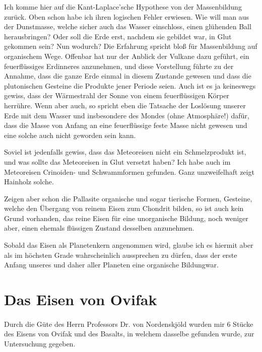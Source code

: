 \documentclass[a4paper, 12pt, oneside]{article}
\begin{document}
Ich komme hier auf die Kant-Laplace'sche Hypothese von der Massenbildung zurück. Oben schon habe ich ihren logischen Fehler erwiesen. Wie will man aus der Dunstmasse, welche sicher auch das Wasser einschloss, einen glühenden Ball herausbringen? Oder soll die Erde erst, nachdem sie gebildet war, in Glut gekommen sein? Nun wodurch? Die Erfahrung spricht bloß für Massenbildung auf organischem Wege. Offenbar hat nur der Anblick der Vulkane dazu geführt, ein feuerflüssiges Erdinneres anzunehmen, und diese Vorstellung führte zu der Annahme, dass die ganze Erde einmal in diesem Zustande gewesen und dass die plutonischen Gesteine die Produkte jener Periode seien. Auch ist es ja keineswegs gewiss, dass der Wärmestrahl der Sonne von einem feuerflüssigen Körper herrühre. Wenn aber auch, so spricht eben die Tatsache der Loslösung unserer Erde mit dem Wasser und insbesondere des Mondes (ohne Atmosphäre!) dafür, dass die Masse von Anfang an eine feuerflüssige feste Masse nicht gewesen und eine solche auch nicht geworden sein kann.

Soviel ist jedenfalls gewiss, dass das Meteoreisen nicht ein Schmelzprodukt ist, und was sollte das Meteoreisen in Glut versetzt haben? Ich habe auch im Meteoreisen Crinoiden- und Schwammformen gefunden. Ganz unzweifelhaft zeigt Hainholz solche.

Zeigen aber schon die Pallasite organische und sogar tierische Formen, Gesteine, welche den Übergang von reinem Eisen zum Chondrit bilden, so ist auch kein Grund vorhanden, das reine Eisen für eine unorganische Bildung, noch weniger aber, einen ehemals flüssigen Zustand desselben anzunehmen.

Sobald das Eisen als Planetenkern angenommen wird, glaube ich es hiermit aber als im höchsten Grade wahrscheinlich aussprechen zu dürfen, dass der erste Anfang unseres und daher aller Planeten eine organische Bildungwar.
\clearpage
\section{Das Eisen von Ovifak}
\paragraph{}
Durch die Güte des Herrn Professors Dr. von Nordenskjöld wurden mir 6 Stücke des Eisens von Ovifak und des Basalts, in welchem dasselbe gefunden wurde, zur Untersuchung gegeben.
\end{document}
